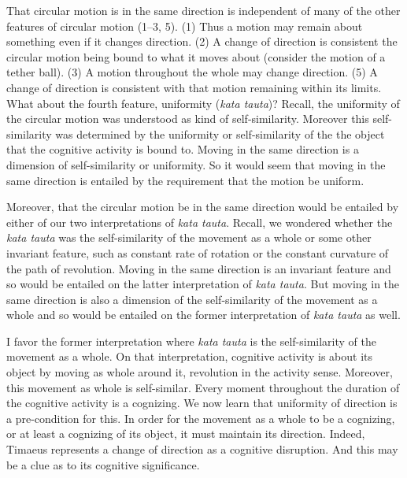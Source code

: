 That circular motion is in the same direction is independent of many of the other features of circular motion (1--3, 5). (1) Thus a motion may remain about something even if it changes direction. (2) A change of direction is consistent the circular motion being bound to what it moves about (consider the motion of a tether ball). (3) A motion throughout the whole may change direction. (5) A change of direction is consistent with that motion remaining within its limits. What about the fourth feature, uniformity (\emph{kata tauta})? Recall, the uniformity of the circular motion was understood as kind of self-similarity. Moreover this self-similarity was determined by the uniformity or self-similarity of the the object that the cognitive activity is bound to. Moving in the same direction is a dimension of self-similarity or uniformity. So it would seem that moving in the same direction is entailed by the requirement that the motion be uniform.

Moreover, that the circular motion be in the same direction would be entailed by either of our two interpretations of \emph{kata tauta}. Recall, we wondered whether the \emph{kata tauta} was the self-similarity of the movement as a whole or some other invariant feature, such as constant rate of rotation or the constant curvature of the path of revolution. Moving in the same direction is an invariant feature and so would be entailed on the latter interpretation of \emph{kata tauta}. But moving in the same direction is also a dimension of the self-similarity of the movement as a whole and so would be entailed on the former interpretation of \emph{kata tauta} as well. 

I favor the former interpretation where \emph{kata tauta} is the self-similarity of the movement as a whole. On that interpretation, cognitive activity is about its object by moving as whole around it, revolution in the activity sense. Moreover, this movement as whole is self-similar. Every moment throughout the duration of the cognitive activity is a cognizing. We now learn that uniformity of direction is a pre-condition for this. In order for the movement as a whole to be a cognizing, or at least a cognizing of its object, it must maintain its direction. Indeed, Timaeus represents a change of direction as a cognitive disruption. And this may be a clue as to its cognitive significance.  

